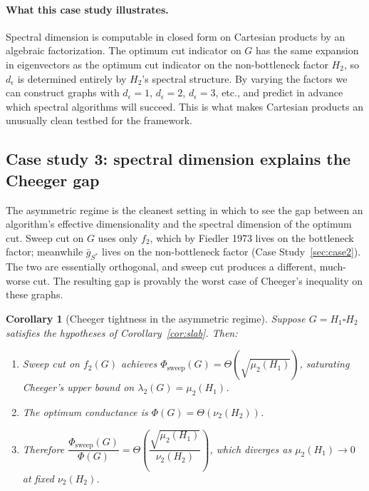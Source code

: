 \documentclass{article}
\newtheorem{corollary}{Corollary}
\theoremstyle{definition}
\theoremstyle{remark}
\begin{document}
\paragraph{What this case study illustrates.} Spectral dimension is computable in closed form on Cartesian products by an algebraic factorization. The optimum cut indicator on $G$ has the same expansion in eigenvectors as the optimum cut indicator on the non-bottleneck factor $H_2$, so $d_\epsilon$ is determined entirely by $H_2$'s spectral structure. By varying the factors we can construct graphs with $d_\epsilon = 1$, $d_\epsilon = 2$, $d_\epsilon = 3$, etc., and predict in advance which spectral algorithms will succeed. This is what makes Cartesian products an unusually clean testbed for the framework.

\subsection{Case study 3: spectral dimension explains the Cheeger gap}
\label{sec:case3}

The asymmetric regime is the cleanest setting in which to see the gap between an algorithm's effective dimensionality and the spectral dimension of the optimum cut. Sweep cut on $G$ uses only $f_2$, which by Fiedler 1973 lives on the bottleneck factor; meanwhile $\bar g_{S^*}$ lives on the non-bottleneck factor (Case Study~\ref{sec:case2}). The two are essentially orthogonal, and sweep cut produces a different, much-worse cut. The resulting gap is provably the worst case of Cheeger's inequality on these graphs.

\begin{corollary}[Cheeger tightness in the asymmetric regime]
\label{cor:cheeger}
Suppose $G = H_1 \square H_2$ satisfies the hypotheses of Corollary~\ref{cor:slab}. Then:
\begin{enumerate}
    \item[(i)] Sweep cut on $f_2(G)$ achieves $\Phi_{\mathrm{sweep}}(G) = \Theta(\sqrt{\mu_2(H_1)})$, saturating Cheeger's upper bound on $\lambda_2(G) = \mu_2(H_1)$.
    \item[(ii)] The optimum conductance is $\Phi(G) = \Theta(\nu_2(H_2))$.
    \item[(iii)] Therefore $\dfrac{\Phi_{\mathrm{sweep}}(G)}{\Phi(G)} = \Theta\!\left(\dfrac{\sqrt{\mu_2(H_1)}}{\nu_2(H_2)}\right)$, which diverges as $\mu_2(H_1) \to 0$ at fixed $\nu_2(H_2)$.
\end{enumerate}
\end{corollary}
\end{document}

